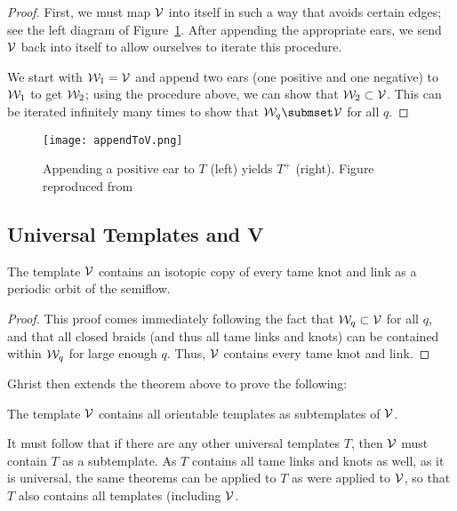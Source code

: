 \documentclass[paper.tex]{subfiles}
\begin{document}
\begin{proof}
    First, we must map $\mathcal{V}$ into itself in such a way that avoids certain edges; see the left diagram of Figure~\ref{fig:appendToV}. After appending the appropriate ears, we send $\mathcal{V}$ back into itself to allow ourselves to iterate this procedure. 

    We start with $\mathcal{W}_1 = \mathcal{V}$ and append two ears (one positive and one negative) to $\mathcal{W}_1$ to get $\mathcal{W}_2$; using the procedure above, we can show that $\mathcal{W}_2 \subset \mathcal{V}$. This can be iterated infinitely many times to show that $\W_q \submset \V$ for all $q$. 
\end{proof}

\begin{figure}[h]
    \centering
    \texttt{[image: appendToV.png]}
    \caption{Appending a positive ear to $T$ (left) yields $T^+$ (right). Figure reproduced from} \label{fig:appendToV} %
\end{figure}




\subsection{Universal Templates and V}

\begin{theorem}[Ghrist 1995]
    The template $\mathcal{V}$ contains an isotopic copy of every tame knot and link as a periodic orbit of the semiflow. 
\end{theorem}
\begin{proof}
    This proof comes immediately following the fact that $\mathcal{W}_q \subset \mathcal{V}$ for all $q$, and that all closed braids (and thus all tame links and knots) can be contained within $\mathcal{W}_q$ for large enough $q$. Thus, $\mathcal{V}$ contains every tame knot and link. 
\end{proof}


Ghrist then extends the theorem above to prove the following: 

\begin{theorem}[Ghrist 1995] 
    The template $\mathcal{V}$ contains all orientable templates as subtemplates of $\mathcal{V}$. 
\end{theorem}

It must follow that if there are any other universal templates $T$, then $\mathcal{V}$ must contain $T$ as a subtemplate. As $T$ contains all tame links and knots as well, as it is universal, the same theorems can be applied to $T$ as were applied to $\mathcal{V}$, so that $T$ also contains all templates (including $\mathcal{V}$. 
\end{document}
